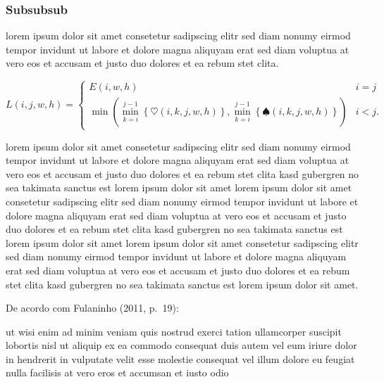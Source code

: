 \subsubsection{Subsubsub}

lorem ipsum dolor sit amet consetetur sadipscing elitr sed diam nonumy
eirmod tempor invidunt ut labore et dolore magna aliquyam erat sed diam
voluptua at vero eos et accusam et justo duo dolores et ea rebum
stet clita.~\cite{GOLDENBERGAPL02}

\begin{equation}\label{eq:apl}%
    L\left(i,j,w,h\right)=
    \begin{cases}
      E\left(i,w,h\right) & i=j\\
      \min\left(\min_{k=i}^{j-1}\left\{\heartsuit\left(i,k,j,w,h\right)\right\},
                \min_{k=i}^{j-1}\left\{\spadesuit\left(i,k,j,w,h\right)\right\}\right) & i<j\text{.}
    \end{cases}
\end{equation}

lorem ipsum dolor sit amet consetetur sadipscing elitr sed diam nonumy
eirmod tempor invidunt ut labore et dolore magna aliquyam erat sed diam
voluptua at vero eos et accusam et justo duo dolores et ea rebum stet clita
kasd gubergren no sea takimata sanctus est lorem ipsum dolor sit amet lorem
ipsum dolor sit amet consetetur sadipscing elitr sed diam nonumy eirmod
tempor invidunt ut labore et dolore magna aliquyam erat sed diam voluptua at
vero eos et accusam et justo duo dolores et ea rebum stet clita kasd
gubergren no sea takimata sanctus est lorem ipsum dolor sit amet lorem ipsum
dolor sit amet consetetur sadipscing elitr sed diam nonumy eirmod tempor
invidunt ut labore et dolore magna aliquyam erat sed diam voluptua at vero
eos et accusam et justo duo dolores et ea rebum stet clita kasd gubergren no
sea takimata sanctus est lorem ipsum dolor sit amet.

%
De acordo com Fulaninho (2011, p.~19):

\begin{directcite}
ut wisi enim ad minim veniam quis nostrud exerci tation ullamcorper suscipit
lobortis nisl ut aliquip ex ea commodo consequat duis autem vel eum iriure
dolor in hendrerit in vulputate velit esse molestie consequat vel illum
dolore eu feugiat nulla facilisis at vero eros et accumsan et
iusto odio
\end{directcite}

